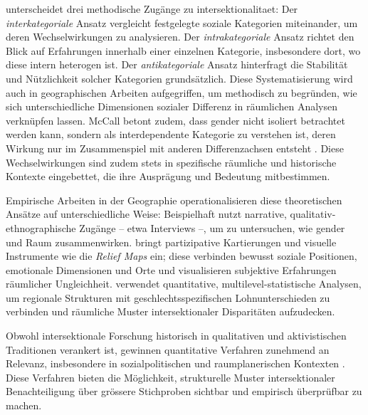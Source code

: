 \textcite{mccallComplexityIntersectionality2005} unterscheidet drei methodische Zugänge zu \gls{intersektionalitaet}: Der \emph{interkategoriale} Ansatz vergleicht festgelegte soziale Kategorien miteinander, um deren Wechselwirkungen zu analysieren. Der \emph{intrakategoriale} Ansatz richtet den Blick auf Erfahrungen innerhalb einer einzelnen Kategorie, insbesondere dort, wo diese intern heterogen ist. Der \emph{antikategoriale} Ansatz hinterfragt die Stabilität und Nützlichkeit solcher Kategorien grundsätzlich. Diese Systematisierung wird auch in geographischen Arbeiten aufgegriffen, um methodisch zu begründen, wie sich unterschiedliche Dimensionen sozialer Differenz in räumlichen Analysen verknüpfen lassen. McCall betont zudem, dass \gls{gender} nicht isoliert betrachtet werden kann, sondern als interdependente Kategorie zu verstehen ist, deren Wirkung nur im Zusammenspiel mit anderen Differenzachsen entsteht \parencite{mccallSpatialRoutesGender1998}. Diese Wechselwirkungen sind zudem stets in spezifische räumliche und historische Kontexte eingebettet, die ihre Ausprägung und Bedeutung mitbestimmen.

Empirische Arbeiten in der Geographie operationalisieren diese theoretischen Ansätze auf unterschiedliche Weise: Beispielhaft nutzt \textcite{fensterRightGenderedCity2005} narrative, qualitativ-ethnographische Zugänge -- etwa Interviews --, um zu untersuchen, wie \gls{gender} und Raum zusammenwirken. \textcite{rodo-de-zarateDevelopingGeographiesIntersectionality2014} bringt partizipative Kartierungen und visuelle Instrumente wie die \emph{Relief Maps} ein; diese verbinden bewusst soziale Positionen, emotionale Dimensionen und Orte und visualisieren subjektive Erfahrungen räumlicher Ungleichheit. \textcite{mccallSpatialRoutesGender1998} verwendet quantitative, multilevel-statistische Analysen, um regionale Strukturen mit geschlechtsspezifischen Lohnunterschieden zu verbinden und räumliche Muster intersektionaler Disparitäten aufzudecken. 

\vspace{2em}

Obwohl intersektionale Forschung historisch in qualitativen und aktivistischen Traditionen verankert ist, gewinnen quantitative Verfahren zunehmend an Relevanz, insbesondere in sozialpolitischen und raumplanerischen Kontexten \parencite{bauerIntersectionalityQuantitativeResearch2021}. Diese Verfahren bieten die Möglichkeit, strukturelle Muster intersektionaler Benachteiligung über grössere Stichproben sichtbar und empirisch überprüfbar zu machen.

